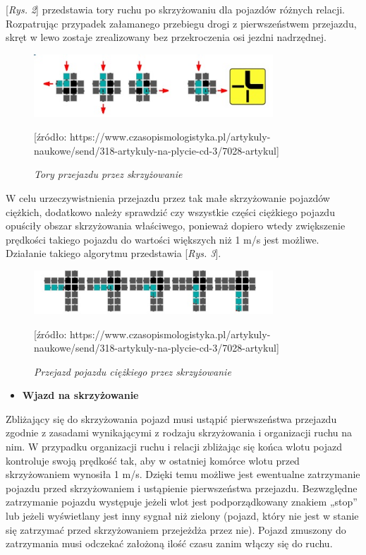 \documentclass{sprawozdanie-agh}
\begin{document}
	[\textit{Rys. 2}] przedstawia tory ruchu po skrzyżowaniu dla pojazdów różnych relacji. Rozpatrując przypadek załamanego przebiegu drogi z pierwszeństwem przejazdu, skręt w lewo zostaje zrealizowany bez przekroczenia osi jezdni nadrzędnej.

	\begin{figure}[H]
		\centering
		\includegraphics[width=0.8\textwidth]{S2.jpg}
		\caption{\textit{Tory przejazdu przez skrzyżowanie}}
		[\small{źródło: https://www.czasopismologistyka.pl/artykuly-naukowe/send/318-artykuly-na-plycie-cd-3/7028-artykul}]
		\label{fig:S2}
	\end{figure}

	W celu urzeczywistnienia przejazdu przez tak małe skrzyżowanie pojazdów ciężkich, dodatkowo należy sprawdzić czy wszystkie części ciężkiego pojazdu opuściły obszar skrzyżowania właściwego, ponieważ dopiero wtedy zwiększenie prędkości takiego pojazdu do wartości większych niż 1 m/s jest możliwe. Działanie takiego algorytmu przedstawia [\textit{Rys. 3}].

	\begin{figure}[H]
		\centering
		\includegraphics[width=0.8\textwidth]{S3.jpg}
		\caption{\textit{Przejazd pojazdu ciężkiego przez skrzyżowanie}}
		[\small{źródło: https://www.czasopismologistyka.pl/artykuly-naukowe/send/318-artykuly-na-plycie-cd-3/7028-artykul}]
		\label{fig:S3}
	\end{figure}


	\begin{itemize}
		\item{\textbf{Wjazd na skrzyżowanie}}
	\end{itemize}

	Zbliżający się do skrzyżowania pojazd musi ustąpić pierwszeństwa przejazdu zgodnie z zasadami wynikającymi z rodzaju skrzyżowania i organizacji ruchu na nim. W przypadku organizacji ruchu i relacji zbliżając się końca wlotu pojazd kontroluje swoją prędkość tak, aby w ostatniej komórce wlotu przed skrzyżowaniem wynosiła 1 m/s. Dzięki temu możliwe jest ewentualne zatrzymanie pojazdu przed skrzyżowaniem i ustąpienie pierwszeństwa przejazdu. Bezwzględne zatrzymanie pojazdu występuje jeżeli wlot jest podporządkowany znakiem „stop” lub jeżeli wyświetlany jest inny sygnał niż zielony (pojazd, który nie jest w stanie się zatrzymać przed skrzyżowaniem przejeżdża przez nie). Pojazd zmuszony do zatrzymania musi odczekać założoną ilość czasu zanim włączy się do ruchu.
\end{document}
